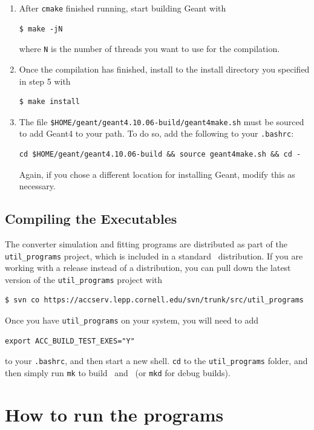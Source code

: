 \documentclass[12pt]{article}
\begin{document}
\begin{enumerate}
\item
After \texttt{cmake} finished running, start building Geant with
\begin{verbatim}
$ make -jN
\end{verbatim}
where \texttt{N} is the number of threads you want to use for the compilation.

\item
Once the compilation has finished, install to the install directory you specified in step 5 with
\begin{verbatim}
$ make install
\end{verbatim}

\item
The file \texttt{\$HOME/geant/geant4.10.06-build/geant4make.sh} must be sourced to add Geant4 to your path.
To do so, add the following to your \texttt{.bashrc}:
\begin{verbatim}
cd $HOME/geant/geant4.10.06-build && source geant4make.sh && cd -
\end{verbatim}
Again, if you chose a different location for installing Geant, modify this as necessary.

\end{enumerate}



\subsection{Compiling the Executables}
The converter simulation and fitting programs are distributed as part of the \texttt{util\_programs} project, which is included in a standard \bmad \, distribution.
If you are working with a release instead of a distribution, you can pull down the latest version of the \texttt{util\_programs} project with
\begin{verbatim}
$ svn co https://accserv.lepp.cornell.edu/svn/trunk/src/util_programs
\end{verbatim}
Once you have \texttt{util\_programs} on your system, you will need to add
\begin{verbatim}
export ACC_BUILD_TEST_EXES="Y"
\end{verbatim}
to your \texttt{.bashrc}, and then start a new shell.
\texttt{cd} to the \texttt{util\_programs} folder, and then simply run \texttt{mk} to build \exes \, and \exef \, (or \texttt{mkd} for debug builds).



\section{How to run the programs}
\end{document}
